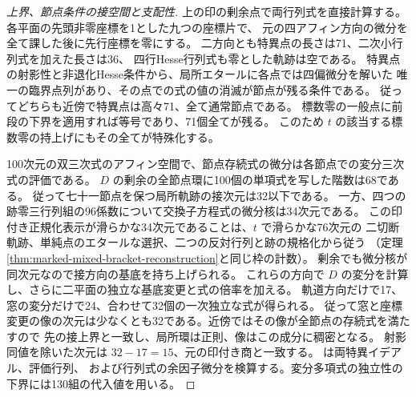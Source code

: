 \begin{proof}[上界、節点条件の接空間と支配性]
上の印の剰余点で両行列式を直接計算する。各平面の先頭非零座標を1とした九つの座標片で、
元の四アフィン方向の微分を全て課した後に先行座標を零にする。
二方向とも特異点の長さは71、二次小行列式を加えた長さは36、
四行Hesse行列式も零とした軌跡は空である。
特異点の射影性と非退化Hesse条件から、局所エタールに各点では四偏微分を解いた
唯一の臨界点列があり、その点での式の値の消滅が節点が残る条件である。
従ってどちらも近傍で特異点は高々71、全て通常節点である。
標数零の一般点に前段の下界を適用すれば等号であり、71個全てが残る。
このため $t$ の該当する標数零の持上げにもその全てが特殊化する。

100次元の双三次式のアフィン空間で、節点存続式の微分は各節点での変分三次式の評価である。
$D$ の剰余の全節点環に100個の単項式を写した階数は68である。
従って七十一節点を保つ局所軌跡の接次元は32以下である。
一方、四つの跡零三行列組の96係数について交換子方程式の微分核は34次元である。
この印付き正規化表示が滑らかな34次元であることは、$t$ で滑らかな76次元の
二切断軌跡、単純点のエタールな選択、二つの反対行列と跡の規格化から従う
（定理\ref{thm:marked-mixed-bracket-reconstruction}と同じ枠の計数）。
剰余でも微分核が同次元なので接方向の基底を持ち上げられる。
これらの方向で $D$ の変分を計算し、さらに二平面の独立な基底変更と式の倍率を加える。
軌道方向だけで17、窓の変分だけで24、合わせて32個の一次独立な式が得られる。
従って窓と座標変更の像の次元は少なくとも32である。近傍ではその像が全節点の存続式を満たすので
先の接上界と一致し、局所環は正則、像はこの成分に稠密となる。
射影同値を除いた次元は $32-17=15$、元の印付き商と一致する。
 は両特異イデアル、評価行列、
および行列式の余因子微分を検算する。変分多項式の独立性の下界には130組の代入値を用いる。
\end{proof}
